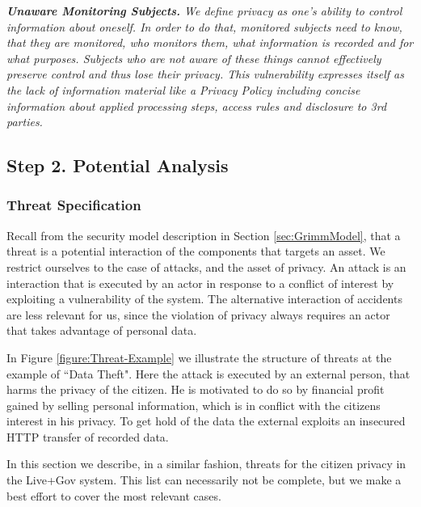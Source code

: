 \documentclass[runningheads,a4paper]{llncs}
\newenvironment{LGContent}
{ \par\color{blue} \it \small }
{ \par }
\begin{document}
\begin{LGContent}
\textbf{Unaware Monitoring Subjects.}
We define privacy as one's ability to control information about
oneself.  In order to do that, monitored subjects need to know, that
they are monitored, who monitors them, what information is recorded
and for what purposes.  Subjects who are not aware of these things
cannot effectively preserve control and thus lose their privacy.  This
vulnerability expresses itself as the lack of information material
like a Privacy Policy including concise information about applied
processing steps, access rules and disclosure to 3rd parties.

\subsection{Step 2. Potential Analysis}

\subsubsection{Threat Specification}



Recall from the security model description in Section \ref{sec:GrimmModel}, that a threat is a potential interaction of the components that targets an asset.
We restrict ourselves to the case of attacks, and the asset of privacy.
An attack is an interaction that is executed by an actor in response to a conflict of interest by exploiting a vulnerability of the system.
The alternative interaction of accidents are less relevant for us, since the violation of privacy always requires an actor that takes advantage of personal data.

In Figure \ref{figure:Threat-Example} we illustrate the structure of threats at the example of ``Data Theft".
Here the attack is executed by an external person, that harms the privacy of the citizen.
He is motivated to do so by financial profit gained by selling personal information, which is in conflict with the citizens interest in his privacy.
To get hold of the data the external exploits an insecured HTTP transfer of recorded data.

In this section we describe, in a similar fashion, threats for the citizen privacy in the Live+Gov system.
This list can necessarily not be complete, but we make a best effort to cover the most relevant cases.




\end{LGContent}
\end{document}
